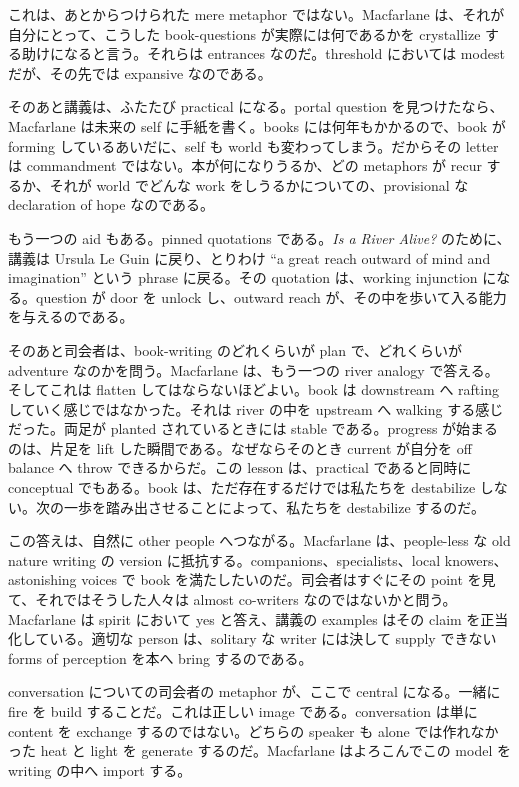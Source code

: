 これは、あとからつけられた mere metaphor ではない。Macfarlane は、それが自分にとって、こうした book-questions が実際には何であるかを crystallize する助けになると言う。それらは entrances なのだ。threshold においては modest だが、その先では expansive なのである。

そのあと講義は、ふたたび practical になる。portal question を見つけたなら、Macfarlane は未来の self に手紙を書く。books には何年もかかるので、book が forming しているあいだに、self も world も変わってしまう。だからその letter は commandment ではない。本が何になりうるか、どの metaphors が recur するか、それが world でどんな work をしうるかについての、provisional な declaration of hope なのである。

もう一つの aid もある。pinned quotations である。\emph{Is a River Alive?} のために、講義は Ursula Le Guin に戻り、とりわけ ``a great reach outward of mind and imagination'' という phrase に戻る。その quotation は、working injunction になる。question が door を unlock し、outward reach が、その中を歩いて入る能力を与えるのである。

そのあと司会者は、book-writing のどれくらいが plan で、どれくらいが adventure なのかを問う。Macfarlane は、もう一つの river analogy で答える。そしてこれは flatten してはならないほどよい。book は downstream へ rafting していく感じではなかった。それは river の中を upstream へ walking する感じだった。両足が planted されているときには stable である。progress が始まるのは、片足を lift した瞬間である。なぜならそのとき current が自分を off balance へ throw できるからだ。この lesson は、practical であると同時に conceptual でもある。book は、ただ存在するだけでは私たちを destabilize しない。次の一歩を踏み出させることによって、私たちを destabilize するのだ。

この答えは、自然に other people へつながる。Macfarlane は、people-less な old nature writing の version に抵抗する。companions、specialists、local knowers、astonishing voices で book を満たしたいのだ。司会者はすぐにその point を見て、それではそうした人々は almost co-writers なのではないかと問う。Macfarlane は spirit において yes と答え、講義の examples はその claim を正当化している。適切な person は、solitary な writer には決して supply できない forms of perception を本へ bring するのである。

conversation についての司会者の metaphor が、ここで central になる。一緒に fire を build することだ。これは正しい image である。conversation は単に content を exchange するのではない。どちらの speaker も alone では作れなかった heat と light を generate するのだ。Macfarlane はよろこんでこの model を writing の中へ import する。

